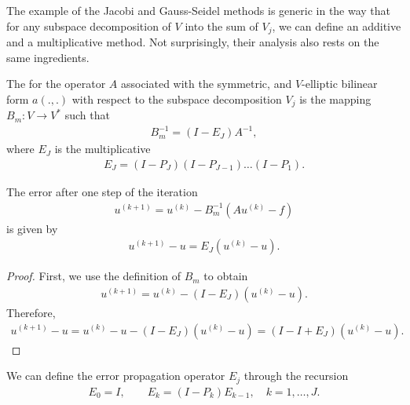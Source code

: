 \begin{intro}
  The example of the Jacobi and Gauss-Seidel methods is generic in the
  way that for any subspace decomposition of $V$ into the sum of
  $V_j$, we can define an additive and a multiplicative method. Not
  surprisingly, their analysis also rests on the same ingredients.
\end{intro}

\begin{definition}
  The  for the operator $A$ associated
  with the symmetric, and $V$-elliptic bilinear form $a(.,.)$ with
  respect to the subspace decomposition $V_j$ is the mapping $B_m:
  V \to V^*$ such that
  \begin{gather}
    \label{eq:schwarz:34}
    B_m^{-1} = (I -  E_J) A^{-1},
  \end{gather}
  where $E_J$ is the multiplicative 
  \begin{gather}
    \label{eq:schwarz:35}
    E_J = (I - P_J)(I - P_{J-1})\dots(I - P_1).
  \end{gather}
\end{definition}

\begin{lemma}
  The error after one step of the iteration
  \begin{gather*}
    u^{(k+1)} = u^{(k)} - B_m^{-1}\left(A u^{(k)} - f\right)
  \end{gather*}
  is given by
  \begin{gather*}
    u^{(k+1)} - u = E_J \left(u^{(k)} - u\right).
  \end{gather*}
\end{lemma}

\begin{proof}
  First, we use the definition of $B_m$ to obtain
  \begin{gather*}
    u^{(k+1)} = u^{(k)} - (I -  E_J) \left(u^{(k)} - u\right).
  \end{gather*}
  Therefore,
  \begin{gather*}
    u^{(k+1)} - u = u^{(k)} - u - (I -  E_J) \left(u^{(k)} - u\right)
    = (I-I+E_J) \left(u^{(k)} - u\right).
  \end{gather*}  
\end{proof}

\begin{remark}
  We can define the error propagation operator $E_j$ through the
  recursion
  \begin{gather}
    \label{eq:schwarz:45}
    E_{0} = I, \qquad E_{k} = (I - P_k) E_{k-1}, \quad k=1,\dots,J.
  \end{gather}
\end{remark}

